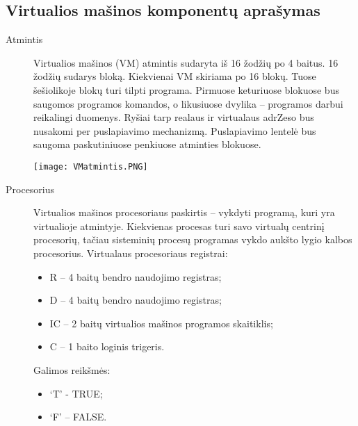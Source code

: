 \subsection{Virtualios mašinos komponentų aprašymas}
\begin{description}
\item[Atmintis] \leavevmode 

Virtualios mašinos (VM) atmintis sudaryta iš 16 žodžių po 4 baitus. 16 žodžių sudarys bloką. Kiekvienai VM skiriama po 16 blokų. Tuose šešiolikoje blokų turi tilpti programa.
Pirmuose keturiuose blokuose bus saugomos programos komandos, o likusiuose dvylika – programos darbui reikalingi duomenys.
Ryšiai tarp realaus ir virtualaus adrZeso bus nusakomi per puslapiavimo mechanizmą. Puslapiavimo lentelė bus saugoma paskutiniuose penkiuose atminties blokuose.


\texttt{[image: VMatmintis.PNG]}

\item[Procesorius]  \leavevmode 
  
Virtualios mašinos procesoriaus paskirtis – vykdyti programą, kuri yra virtualioje atmintyje. Kiekvienas procesas turi savo virtualų centrinį procesorių, tačiau sisteminių procesų programas vykdo aukšto lygio kalbos procesorius. 
Virtualaus procesoriaus registrai:
\begin{itemize}
\item R – 4 baitų bendro naudojimo registras;
\item D – 4 baitų bendro naudojimo registras;
\item IC – 2 baitų virtualios mašinos programos skaitiklis;
\item C – 1 baito loginis trigeris.
\end{itemize}
Galimos reikšmės:
\begin{itemize}
\item `T' - TRUE;
\item `F' – FALSE.
\end{itemize}  
  

\end{description}
